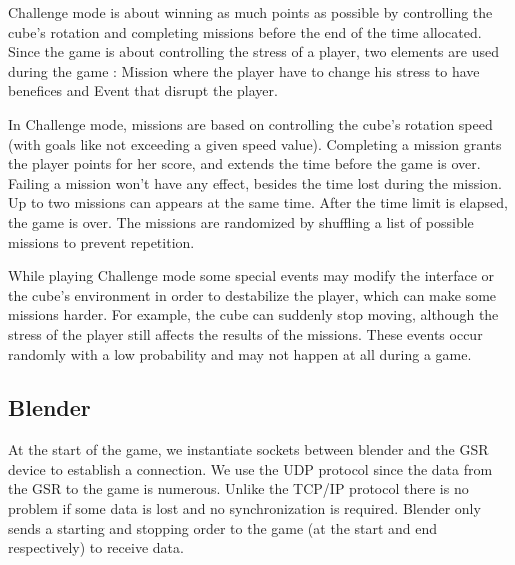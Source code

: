 \documentclass[12pt,a4paper]{article}
\begin{document}
Challenge mode is about winning as much points as possible by controlling the cube's rotation and completing missions before the end of the time allocated. Since the game is about controlling the stress of a player, two elements are used during the game : Mission where the player have to change his stress to have benefices and Event that disrupt the player.

In Challenge mode, missions are based on controlling the cube's rotation speed (with goals like not exceeding a given speed value). Completing a mission grants the player points for her score, and extends the time before the game is over. Failing a mission won't have any effect, besides the time lost during the mission. Up to two missions can appears at the same time. After the time limit is elapsed, the game is over. The missions are randomized  by shuffling a list of possible missions to prevent repetition.


While playing Challenge mode some special events may modify the interface or the cube's environment in order to destabilize the player, which can make some missions harder. For example, the cube can suddenly stop moving, although the stress of the player still affects the results of the missions. These events occur randomly with a low probability and may not happen at all during a game.

%


\subsection{Blender}

At the start of the game, we instantiate sockets between blender and the GSR device to establish a connection. We use the UDP protocol since the data from the GSR to the game is numerous. Unlike the TCP/IP protocol there is no problem if some data is lost and no synchronization is required. Blender only sends a starting and stopping order to the game (at the start and end respectively) to receive data.
\end{document}
